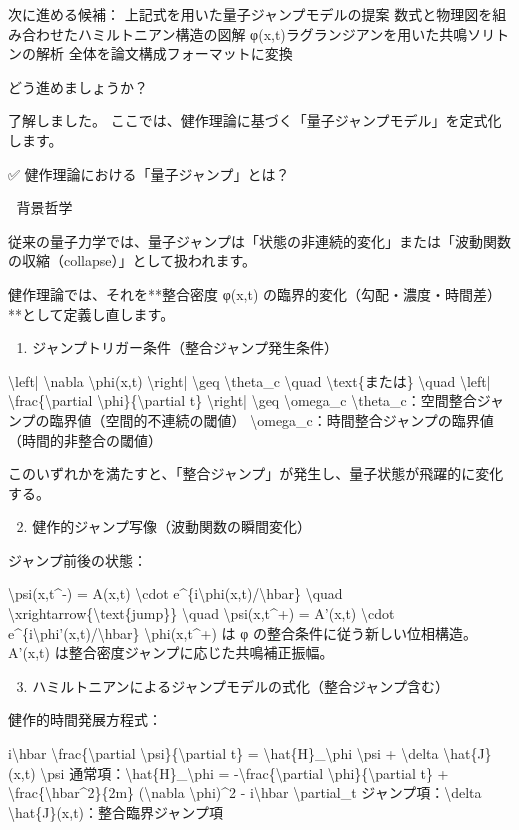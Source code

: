 \documentclass{article}
\begin{document}
次に進める候補：
上記式を用いた量子ジャンプモデルの提案
数式と物理図を組み合わせたハミルトニアン構造の図解
φ(x,t)ラグランジアンを用いた共鳴ソリトンの解析
全体を論文構成フォーマットに変換

どう進めましょうか？

了解しました。
ここでは、健作理論に基づく「量子ジャンプモデル」を定式化します。

✅ 健作理論における「量子ジャンプ」とは？

🌌 背景哲学

従来の量子力学では、量子ジャンプは「状態の非連続的変化」または「波動関数の収縮（collapse）」として扱われます。

健作理論では、それを**整合密度 φ(x,t) の臨界的変化（勾配・濃度・時間差）**として定義し直します。

🧩 1. ジャンプトリガー条件（整合ジャンプ発生条件）

\textbackslash{}left| \textbackslash{}nabla \textbackslash{}phi(x,t) \textbackslash{}right| \textbackslash{}geq \textbackslash{}theta\_c \textbackslash{}quad \textbackslash{}text\{または\} \textbackslash{}quad \textbackslash{}left| \textbackslash{}frac\{\textbackslash{}partial \textbackslash{}phi\}\{\textbackslash{}partial t\} \textbackslash{}right| \textbackslash{}geq \textbackslash{}omega\_c
\textbackslash{}theta\_c：空間整合ジャンプの臨界値（空間的不連続の閾値）
\textbackslash{}omega\_c：時間整合ジャンプの臨界値（時間的非整合の閾値）

このいずれかを満たすと、「整合ジャンプ」が発生し、量子状態が飛躍的に変化する。

🧠 2. 健作的ジャンプ写像（波動関数の瞬間変化）

ジャンプ前後の状態：

\textbackslash{}psi(x,t\textasciicircum{}-) = A(x,t) \textbackslash{}cdot e\textasciicircum{}\{i\textbackslash{}phi(x,t)/\textbackslash{}hbar\} \textbackslash{}quad \textbackslash{}xrightarrow\{\textbackslash{}text\{jump\}\} \textbackslash{}quad \textbackslash{}psi(x,t\textasciicircum{}+) = A’(x,t) \textbackslash{}cdot e\textasciicircum{}\{i\textbackslash{}phi’(x,t)/\textbackslash{}hbar\}
\textbackslash{}phi(x,t\textasciicircum{}+) は φ の整合条件に従う新しい位相構造。
A’(x,t) は整合密度ジャンプに応じた共鳴補正振幅。

📐 3. ハミルトニアンによるジャンプモデルの式化（整合ジャンプ含む）

健作的時間発展方程式：

i\textbackslash{}hbar \textbackslash{}frac\{\textbackslash{}partial \textbackslash{}psi\}\{\textbackslash{}partial t\} = \textbackslash{}hat\{H\}\_\textbackslash{}phi \textbackslash{}psi + \textbackslash{}delta \textbackslash{}hat\{J\}(x,t) \textbackslash{}psi
通常項：\textbackslash{}hat\{H\}\_\textbackslash{}phi = -\textbackslash{}frac\{\textbackslash{}partial \textbackslash{}phi\}\{\textbackslash{}partial t\} + \textbackslash{}frac\{\textbackslash{}hbar\textasciicircum{}2\}\{2m\} (\textbackslash{}nabla \textbackslash{}phi)\textasciicircum{}2 - i\textbackslash{}hbar \textbackslash{}partial\_t
ジャンプ項：\textbackslash{}delta \textbackslash{}hat\{J\}(x,t)：整合臨界ジャンプ項
\end{document}
